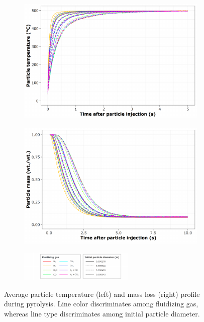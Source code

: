\begin{figure}[H]
    \begin{subfigure}{0.5\textwidth}
        \includegraphics[width=\textwidth]{figures/cfd-particle-temp.pdf}
    \end{subfigure}
    \begin{subfigure}{0.5\textwidth}
        \includegraphics[width=\textwidth]{figures/cfd-particle-mass.pdf}
    \end{subfigure}
    \begin{subfigure}{\textwidth}
        \centering
        \includegraphics[width=0.6\textwidth]{figures/cfd-particle-legend.pdf}
    \end{subfigure}
    \caption{Average particle temperature (left) and mass loss (right) profile during pyrolysis. Line color discriminates among fluidizing gas, whereas line type discriminates among initial particle diameter.}
    \label{fig:cfd-particle}
\end{figure}

